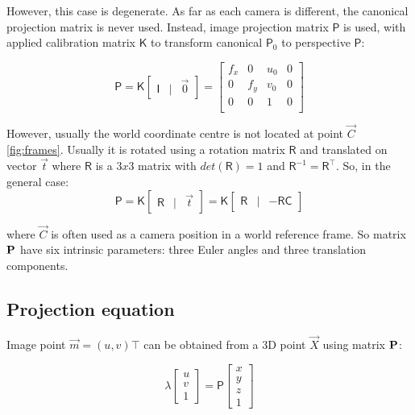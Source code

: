 However, this case is degenerate. 
As far as each camera is different, the canonical projection matrix is never used. Instead, image projection matrix $\pmb{\mathsf{P}}$ is used, with applied calibration matrix $\pmb{\mathsf{K}}$ to transform canonical $\pmb{\mathsf{P}}_0$ to perspective $\pmb{\mathsf{P}}$:

\begin{equation}
\pmb{\mathsf{P}} = \pmb{\mathsf{K}} \begin{bmatrix} \pmb{\mathsf{I}} & | & \vec{0} \end{bmatrix} = 
    \begin{bmatrix} 
    f_x & 0 & u_0 & 0 \\
    0 & f_y & v_0 & 0 \\ 
    0 & 0 & 1 & 0 \\
    \end{bmatrix}    
\end{equation}

However, usually the world coordinate centre is not located at point $\vec{C}$ \autoref{fig:frames}. 
Usually it is rotated using a rotation matrix $\pmb{\mathsf{R}}$ and translated on vector $\vec{t}$ where $\pmb{\mathsf{R}}$ is a $3x3$ matrix with $det(\pmb{\mathsf{R}}) = 1$ and $\pmb{\mathsf{R}}^{-1} = \pmb{\mathsf{R}}^\top$. 
So, in the general case:
\begin{equation}
    \pmb{\mathsf{P}} = \pmb{\mathsf{K}} \begin{bmatrix} \pmb{\mathsf{R}} & | & \vec{t} \end{bmatrix} = 
    \pmb{\mathsf{K}} \begin{bmatrix} \pmb{\mathsf{R}} & | & - \pmb{\mathsf{R}} \pmb{\mathsf{C}} \end{bmatrix}
\end{equation}

where $\vec{C}$ is often used as a camera position in a world reference frame. 
So matrix $\bf{P}$ have six intrinsic parameters: three Euler angles and three translation components. 

\subsection{Projection equation}

Image point $\vec{m} = (u, v)\top$ can be obtained from a 3D point $\vec{X}$ using matrix $\bf{P}$:

\begin{equation}
    \label{eq:projection}
    \lambda \begin{bmatrix} 
        u \\ v \\ 1 \end{bmatrix} = \pmb{\mathsf{P}} \begin{bmatrix} x \\ y \\ z \\ 1
    \end{bmatrix}
\end{equation}

